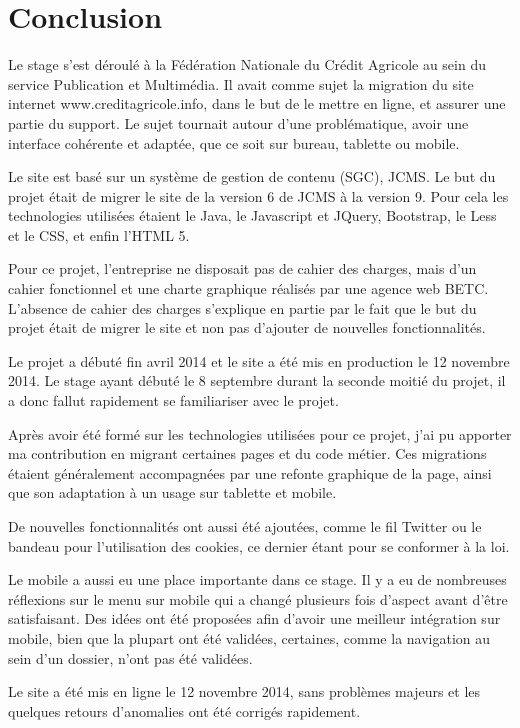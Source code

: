 \documentclass[12pt,a4paper]{article}
\begin{document}
\section{Conclusion}
Le stage s'est déroulé à la Fédération Nationale du Crédit Agricole au sein du service Publication et Multimédia. Il avait comme sujet la migration du site internet www.creditagricole.info, dans le but de le mettre en ligne, et assurer une partie du support. Le sujet tournait autour d'une problématique, avoir une interface cohérente et adaptée, que ce soit sur bureau, tablette ou mobile.\par 
Le site est basé sur un système de gestion de contenu (SGC), \gls{JCMS}. Le but du projet était de migrer le site de la version 6 de \gls{JCMS} à la version 9. Pour cela les technologies utilisées étaient le Java, le Javascript et JQuery, Bootstrap, le Less et le \gls{CSS}, et enfin l'\gls{HTML} 5.\par 
Pour ce projet, l'entreprise ne disposait pas de cahier des charges, mais d'un cahier fonctionnel et une charte graphique réalisés par une agence web BETC. L'absence de cahier des charges s'explique en partie par le fait que le but du projet était de migrer le site et non pas d'ajouter de nouvelles fonctionnalités.\par
Le projet a débuté fin avril 2014 et le site a été mis en production le 12 novembre 2014. Le stage ayant débuté le 8 septembre durant la seconde moitié du projet, il a donc fallut rapidement se familiariser avec le projet.\par 
\medskip
Après avoir été formé sur les technologies utilisées pour ce projet, j'ai pu apporter ma contribution en migrant certaines pages et du code métier. Ces migrations étaient généralement accompagnées par une refonte graphique de la page, ainsi que son adaptation à un usage sur tablette et mobile.\par 
De nouvelles fonctionnalités ont aussi été ajoutées, comme le fil Twitter ou le bandeau pour l'utilisation des cookies, ce dernier étant pour se conformer à la loi.\par 
Le mobile a aussi eu une place importante dans ce stage. Il y a eu de nombreuses réflexions sur le menu sur mobile qui a changé plusieurs fois d'aspect avant d'être satisfaisant. Des idées ont été proposées afin d'avoir une meilleur intégration sur mobile, bien que la plupart ont été validées, certaines, comme la navigation au sein d'un dossier, n'ont pas été validées.\par
Le site a été mis en ligne le 12 novembre 2014, sans problèmes majeurs et les quelques retours d'anomalies ont été corrigés rapidement.\par 
\end{document}
